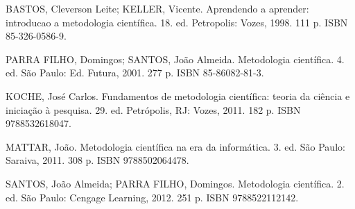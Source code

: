 {{        BASTOS, Cleverson Leite; KELLER, Vicente. Aprendendo a aprender: introducao a metodologia científica. 18. ed. Petropolis: Vozes, 1998. 111 p. ISBN 85-326-0586-9.

        PARRA FILHO, Domingos; SANTOS, João Almeida. Metodologia científica. 4. ed. São Paulo: Ed. Futura, 2001. 277 p. ISBN 85-86082-81-3.

        KOCHE, José Carlos. Fundamentos de metodologia científica: teoria da ciência e iniciação à pesquisa. 29. ed. Petrópolis, RJ: Vozes, 2011. 182 p. ISBN 9788532618047.

        MATTAR, João. Metodologia científica na era da informática. 3. ed. São Paulo: Saraiva, 2011. 308 p. ISBN 9788502064478.

        SANTOS, João Almeida; PARRA FILHO, Domingos. Metodologia científica. 2. ed. São Paulo: Cengage Learning, 2012. 251 p. ISBN 9788522112142.
    }
    

}